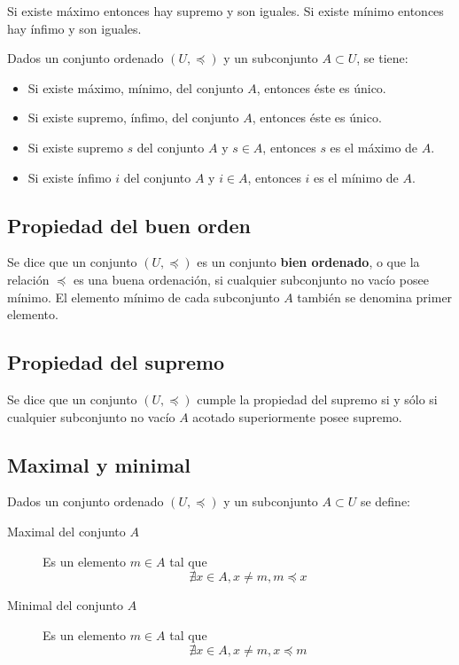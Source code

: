 Si existe máximo entonces hay supremo y son iguales. Si existe mínimo entonces hay ínfimo y son iguales.

Dados un conjunto ordenado $(U,\preceq)$ y un subconjunto $A \subset U$, se tiene:
\begin{itemize}
\item Si existe máximo, mínimo, del conjunto $A$, entonces éste es único.
\item Si existe supremo, ínfimo, del conjunto $A$, entonces éste es único.
\item Si existe supremo $s$ del conjunto $A$ y $s \in A$, entonces $s$ es el máximo de $A$.
\item Si existe ínfimo $i$ del conjunto $A$ y $i \in A$, entonces $i$ es el mínimo de $A$.
\end{itemize}

\subsection{Propiedad del buen orden}

Se dice que un conjunto $(U,\preceq)$ es un conjunto \textbf{bien ordenado}, o que la relación $\preceq$ es una buena ordenación, si cualquier subconjunto no vacío posee mínimo. El elemento mínimo de cada subconjunto $A$ también se denomina primer elemento.

\subsection{Propiedad del supremo}

Se dice que un conjunto $(U,\preceq)$ cumple la propiedad del supremo si y sólo si cualquier subconjunto no vacío $A$ acotado superiormente posee supremo.

\subsection{Maximal y minimal}

Dados un conjunto ordenado $(U,\preceq)$ y un subconjunto $A \subset U$ se define:
\begin{description}
\item[Maximal del conjunto $A$] Es un elemento $m \in A$ tal que
\[
\nexists x \in A, x \neq m, m \preceq x
\] 
\item[Minimal del conjunto $A$] Es un elemento $m \in A$ tal que
\[
\nexists x \in A, x \neq m, x \preceq m
\] 
\end{description}

